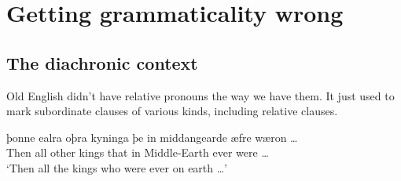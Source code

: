 \chapter{Getting grammaticality wrong}

%
%
%

\section{The diachronic context}


Old English didn't have relative pronouns the way we have them. It just used  to mark subordinate clauses of various kinds, including relative clauses.

\ea \label{ex:kyninga}
    \gll þonne ealra oþra kyninga þe in middangearde æfre wæron \dots\\
        Then all other kings that in Middle-Earth ever were \dots\\
    \glt `Then all the kings who were ever on earth \dots'
\z

